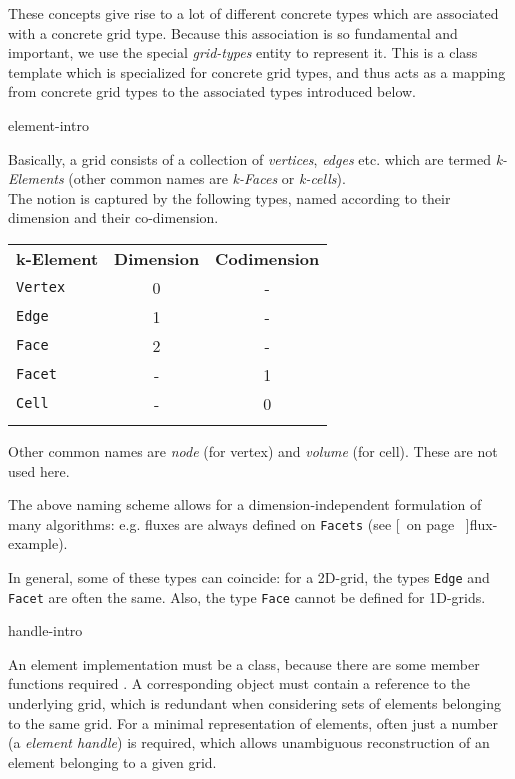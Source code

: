   These concepts give rise to a lot of different concrete types which are associated with a
  concrete grid type.
  Because this association is so fundamental and important,
  we use the special  {\em grid-types\/} entity to represent it.
  This is a class template which is specialized for concrete grid types,
  and thus acts as a mapping from  concrete grid types to the associated types introduced below.
  \begin{Label}{element-intro}
  \end{Label}

  Basically, a grid consists of a collection of {\em vertices\/}, {\em edges\/}
  etc. which are termed {\em k-Elements\/} (other common
  names are {\em k-Faces\/} or {\em k-cells\/}). 
  \\
  The notion is captured by the following types, named according to their dimension and their
  co-dimension.

      
  \begin{tabular}{lcc} 
    \T\\ \hline
    \bf  k-Element &  \bf  Dimension &  \bf  Codimension  \\ \hline
    {\tt Vertex} &   0 &   -  \\
    {\tt Edge} &   1 &   -  \\ 
    {\tt Face} &   2 &   -  \\
    {\tt Facet} &   - &   1  \\
    {\tt Cell} &   - &   0  
    \T\\ \hline \\
  \end{tabular}
  
  Other common names are {\em node\/} (for vertex) and {\em volume\/} (for cell).
  These are not used here.
        
  The above naming scheme allows for a dimension-independent
  formulation of many algorithms: e.g. fluxes are always defined on {\tt Facets}
  (see [~on page \pageref{flux-example}~]{flux-example}).
      
  In general, some of these types can coincide: for a 2D-grid, the types {\tt Edge}
  and {\tt Facet} are often the same. 
  Also,  the type {\tt Face} cannot be defined for 1D-grids.

  \begin{Label}{handle-intro}
  \end{Label}
   An element  implementation must be a class, 
   because there are some member functions
   required . 
   A corresponding object must contain a reference to the underlying grid,
   which is redundant when considering sets of elements belonging to the same grid.
   For a minimal representation of elements, often just a number (a {\em element handle\/})
   is required, which allows unambiguous reconstruction of an element belonging to a given grid.
   
